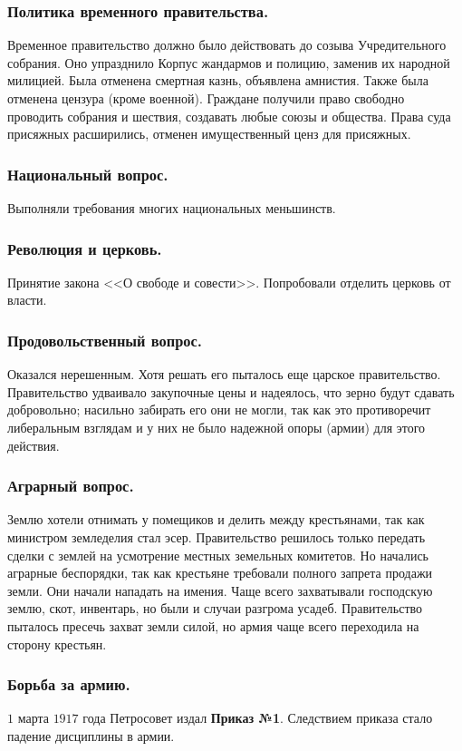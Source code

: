 \documentclass[12pt]{article}
\begin{document}
	\subsubsection{Политика временного правительства.}
	Временное правительство должно было действовать до созыва Учредительного собрания. Оно упразднило Корпус жандармов и полицию, заменив их народной милицией. Была отменена смертная казнь, объявлена амнистия. Также была отменена цензура (кроме военной). Граждане получили право свободно проводить собрания и шествия, создавать любые союзы и общества. Права суда присяжных расширились, отменен имущественный ценз для присяжных.
	\subsubsection{Национальный вопрос.}
	Выполняли требования многих национальных меньшинств.
	\subsubsection{Революция и церковь.}
	Принятие закона <<О свободе и совести>>. Попробовали отделить церковь от власти.
	\subsubsection{Продовольственный вопрос.}
	Оказался нерешенным. Хотя решать его пыталось еще царское правительство. Правительство удваивало закупочные цены и надеялось, что зерно будут сдавать добровольно; насильно забирать его они не могли, так как это противоречит либеральным взглядам и у них не было надежной опоры (армии) для этого действия.
	\subsubsection{Аграрный вопрос.}
	Землю хотели отнимать у помещиков и делить между крестьянами, так как министром земледелия стал эсер. Правительство решилось только передать сделки с землей на усмотрение местных земельных комитетов. Но начались аграрные беспорядки, так как крестьяне требовали полного запрета продажи земли. Они начали нападать на имения. Чаще всего захватывали господскую землю, скот, инвентарь, но были и случаи разгрома усадеб. Правительство пыталось пресечь захват земли силой, но армия чаще всего переходила на сторону крестьян.
	\subsubsection{Борьба за армию.}
	$1$ марта $1917$ года Петросовет издал \textbf{Приказ №1}. Следствием приказа стало падение дисциплины в армии.
\end{document}
